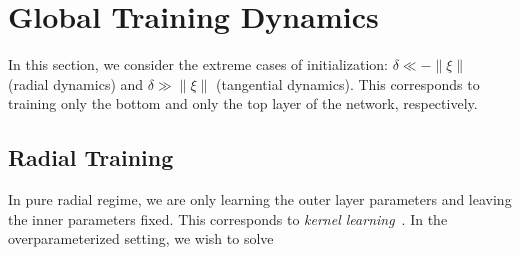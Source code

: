 

\section{Global Training Dynamics}

In this section, we consider the extreme cases of initialization: $\delta \ll -\|\xi\|$ (radial dynamics) and $\delta \gg \|\xi\|$ (tangential dynamics). This corresponds to training only the bottom and only the top layer of the network, respectively. 




\subsection{Radial Training}


In pure radial regime, we are only learning the outer layer parameters and leaving the inner parameters fixed. This corresponds to \emph{kernel learning}~. In the overparameterized setting, we wish to solve

